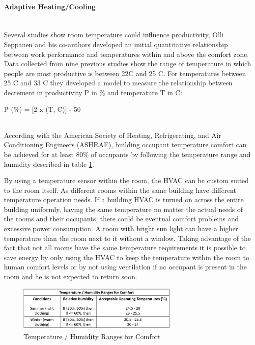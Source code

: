 \paragraph{Adaptive Heating/Cooling}\mbox{}\\


Several studies show room temperature could influence productivity, Olli Seppanen and his co-authors developed an initial quantitative relationship between work performance and temperatures within and above the comfort zone\cite{temperature_survey}. Data collected from nine previous studies show the range of temperature in which people are most productive is between 22C and 25 C. For temperatures between 25 C and 33 C they developed a model to measure the relationship between decrement in productivity P in \% and
temperature T in  C: 

P (\%) = [2 x (T, C)] - 50 


\mbox{}\\
According with the American Society of Heating, Refrigerating, and Air Conditioning Engineers (ASHRAE), building occupant temperature comfort can be achieved for at least 80\% of occupants\cite{std_ASHRAE_55} by following the temperature range and humidity described in table \ref{tab_temperature}.

 
By using a temperature sensor within the room, the HVAC can be custom suited to the room itself. As different rooms within the same building have different temperature operation needs. If a building HVAC is turned on across the entire building uniformly, having the same temperature no matter the actual needs of the rooms and their occupants, there could be eventual comfort problems and excessive power consumption. A room with bright sun light can have a higher temperature than the room next to it without a window. Taking advantage of the fact that not all rooms have the same temperature requirements it is possible to save energy by only using the HVAC to keep the temperature within the room to human comfort levels or by not using ventilation if no occupant is present in the room and he is not expected to return soon.




\begin{figure}[h]
\centering
\includegraphics[width=0.7\textwidth]{Figures/tabela_temperatura}
\caption{Temperature / Humidity Ranges for Comfort}
\label{tab_temperature}
\end{figure}


